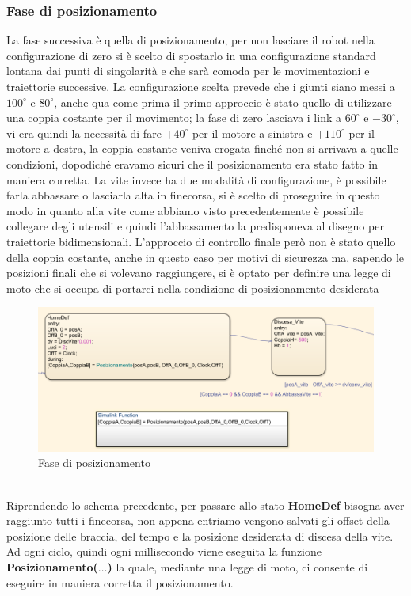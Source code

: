 \subsubsection{Fase di posizionamento}
La fase successiva è quella di posizionamento, per non lasciare il robot nella configurazione di zero si è scelto di spostarlo in una configurazione standard lontana dai punti di singolarità e che sarà comoda per le movimentazioni e traiettorie successive. La configurazione scelta prevede che i giunti siano messi a $100^\circ$ e $80^\circ$, anche qua come prima il primo approccio è stato quello di utilizzare una coppia costante per il movimento; la fase di zero lasciava i link a $60^\circ$ e $-30^\circ$, vi era quindi la necessità di fare $+40^\circ$ per il motore a sinistra e $+110^\circ$ per il motore a destra, la coppia costante veniva erogata finché non si arrivava a quelle condizioni, dopodiché eravamo sicuri che il posizionamento era stato fatto in maniera corretta. La vite invece ha due modalità di configurazione, è possibile farla abbassare o lasciarla alta in finecorsa, si è scelto di proseguire in questo modo in quanto alla vite come abbiamo visto precedentemente è possibile collegare degli utensili e quindi l'abbassamento la predisponeva al disegno per traiettorie bidimensionali. L'approccio di controllo finale però non è stato quello della coppia costante, anche in questo caso per motivi di sicurezza ma, sapendo le posizioni finali che si volevano raggiungere, si è optato per definire una legge di moto che si occupa di portarci nella condizione di posizionamento desiderata
\begin{figure}[ht]
\begin{center}
    \includegraphics[scale=0.7]{Immagini/Sperimentale/state2New.png}
    \caption{Fase di posizionamento}
    \label{fig:Pos}
\end{center}
\end{figure}
\\Riprendendo lo schema precedente, per passare allo stato \textbf{HomeDef} bisogna aver raggiunto tutti i finecorsa, non appena entriamo vengono salvati gli offset della posizione delle braccia, del tempo e la posizione desiderata di discesa della vite. Ad ogni ciclo, quindi ogni millisecondo viene eseguita la funzione \textbf{Posizionamento($\dots$)} la quale, mediante una legge di moto, ci consente di eseguire in maniera corretta il posizionamento.
